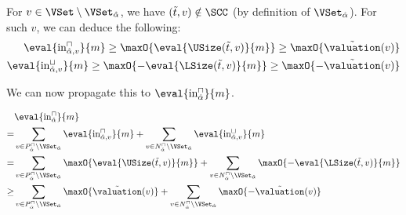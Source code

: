 For $v \in \VSet \setminus \VSet_{\hat{\alpha}}$, we have $(\tilde{t}, v) \notin \SCC$ (by definition of $\VSet_{\hat{\alpha}}$).
For such $v$, we can deduce the following:
\begin{equation} \label{eq:input_rv_var_reduction}
  \begin{split}
    \eval{\text{in}^\sqcap_{\hat{\alpha},v}}{m} \geq \maxO{\eval{\USize(\tilde{t}, v)}{m}} \geq \maxO{\tilde{\valuation}(v)} \\
    \eval{\text{in}^\sqcup_{\hat{\alpha},v}}{m} \geq \maxO{-\eval{\LSize(\tilde{t}, v)}{m}} \geq \maxO{-\tilde{\valuation}(v)}
  \end{split}
\end{equation}


We can now propagate this to $\eval{\text{in}^\sqcap_{\hat{\alpha}}}{m}$.

\begin{equation} \label{eq:input_rv_reduction}
  \begin{split}
  & \eval{\text{in}^\sqcap_{\hat{\alpha}}}{m} \\
  = & \sum_{v \in P_{\hat{\alpha}}^\sqcap \setminus \VSet_{\hat{\alpha}}} \eval{\text{in}^\sqcap_{{\hat{\alpha}},v}}{m}
    + \sum_{v \in N_{\hat{\alpha}}^\sqcap \setminus \VSet_{\hat{\alpha}}} \eval{\text{in}^\sqcup_{{\hat{\alpha}},v}}{m} \\
  = & \sum_{v \in P_{\hat{\alpha}}^\sqcap \setminus \VSet_{\hat{\alpha}}} \maxO{\eval{\USize(\tilde{t}, v)}{m}}
    + \sum_{v \in N_{\hat{\alpha}}^\sqcap \setminus \VSet_{\hat{\alpha}}} \maxO{-\eval{\LSize(\tilde{t}, v)}{m}} \\
  \geq & \sum_{v \in P_{\hat{\alpha}}^\sqcap \setminus \VSet_{\hat{\alpha}}} \maxO{\tilde{\valuation}(v)}
    + \sum_{v \in N_{\hat{\alpha}}^\sqcap \setminus \VSet_{\hat{\alpha}}} \maxO{-\tilde{\valuation}(v)} \\
  \end{split}
\end{equation}


